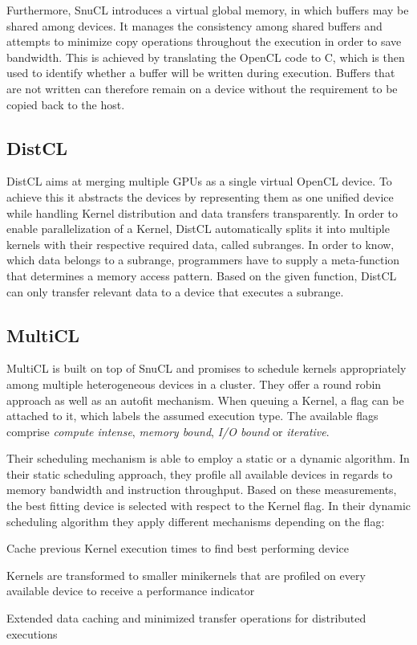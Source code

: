 Furthermore, SnuCL introduces a virtual global memory, in which buffers may be shared among devices. It manages the consistency among shared buffers and attempts to minimize copy operations throughout the execution in order to save bandwidth. This is achieved by translating the OpenCL code to C, which is then used to identify whether a buffer will be written during execution. Buffers that are not written can therefore remain on a device without the requirement to be copied back to the host.

\subsection*{DistCL}
DistCL aims at merging multiple GPUs as a single virtual OpenCL device\cite{distcl}. To achieve this it abstracts the devices by representing them as one unified device while handling Kernel distribution and data transfers transparently. In order to enable parallelization of a Kernel, DistCL automatically splits it into multiple kernels with their respective required data, called subranges. In order to know, which data belongs to a subrange, programmers have to supply a meta-function that determines a memory access pattern. Based on the given function, DistCL can only transfer relevant data to a device that executes a subrange.

\subsection*{MultiCL}

MultiCL is built on top of SnuCL and promises to schedule kernels appropriately among multiple heterogeneous devices in a cluster\cite{multicl}. They offer a round robin approach as well as an autofit mechanism. When queuing a Kernel, a flag can be attached to it, which labels the assumed execution type. The available flags comprise \textit{compute intense}, \textit{memory bound}, \textit{I/O bound} or \textit{iterative}.

Their scheduling mechanism is able to employ a static or a dynamic algorithm. In their static scheduling approach, they profile all available devices in regards to memory bandwidth and instruction throughput. Based on these measurements, the best fitting device is selected with respect to the Kernel flag. In their dynamic scheduling algorithm they apply different mechanisms depending on the flag:

\begin{description}[align=left,leftmargin=0cm]
\item [Iterative] Cache previous Kernel execution times to find best performing device
\item [Compute-intensive] Kernels are transformed to smaller minikernels that are profiled on every available device to receive a performance indicator
\item [I/O-intensive] Extended data caching and minimized transfer operations for distributed executions
\end{description}

